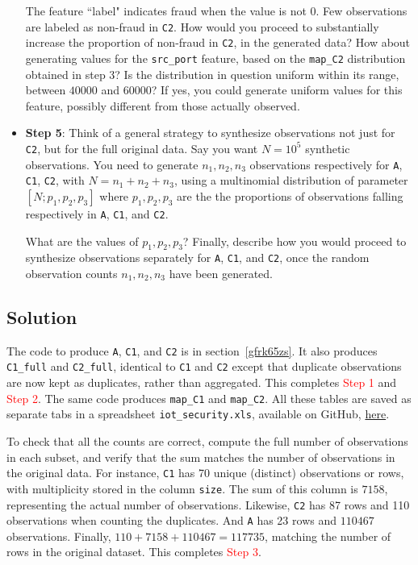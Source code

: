\documentclass[oneside,10pt]{book}
\begin{document}
\begin{itemize}
\noindent The feature ``label" indicates fraud when the value is not 0. Few observations 
 are labeled as non-fraud in \texttt{C2}. How would you proceed to substantially increase the proportion 
 of non-fraud in \texttt{C2}, in the generated data? How about generating values for the \texttt{src\_port} feature, based on the \texttt{map\_C2} distribution obtained 
 in step 3? Is the distribution in question uniform within its range, between $\num{40000}$ 
and $\num{60000}$? If yes, you could generate  uniform
 values for this feature, possibly different from those actually observed.
\vspace{1ex}

\item[] {\bf Step 5}: Think of a general strategy to synthesize observations not just for \texttt{C2}, but for the full
 original data. Say you want $N = 10^5$ synthetic observations. You need to generate $n_1, n_2, n_3$ observations respectively for 
\texttt{A}, \texttt{C1}, \texttt{C2}, with $N = n_1 + n_2 + n_3$, using a 
\textcolor{index}{multinomial distribution} of parameter $[N; p_1, p_2, p_3]$ where
  $p_1, p_2, p_3$ are the the proportions of observations falling respectively in \texttt{A}, \texttt{C1}, and \texttt{C2}.
 
What are the values of $p_1, p_2, p_3$? Finally, describe how you would proceed to synthesize observations 
 separately for \texttt{A}, \texttt{C1}, and \texttt{C2}, once the random observation counts $n_1, n_2, n_3$ have been generated.
 
\end{itemize}

\subsection{Solution}

The code to produce \texttt{A}, \texttt{C1}, and \texttt{C2} is in section~\ref{gfrk65zs}. It also 
produces \texttt{C1\_full} and \texttt{C2\_full}, identical to \texttt{C1} and \texttt{C2} except that duplicate observations are now kept as duplicates, rather
 than aggregated. 
This completes \textcolor{red}{Step 1} and \textcolor{red}{Step 2}. The same code produces
 \texttt{map\_C1} and \texttt{map\_C2}. All these tables are saved as separate tabs
 in a spreadsheet \texttt{iot\_security.xls}, available on GitHub, \href{https://github.com/VincentGranville/Main/blob/main/iot_security.xlsx}{here}.

To check that all the counts are correct, compute the full number of observations in each subset, and verify that the sum matches
  the number of observations in the original data. For instance, \texttt{C1} has 70 unique (distinct) observations or rows, with multiplicity  stored
 in the column \texttt{size}. The sum of this column is $\num{7158}$, representing the actual number of observations.
 Likewise, \texttt{C2} has 87 rows and 110 observations when counting the duplicates. And \texttt{A} has 
 23 rows and $\num{110467}$ observations. Finally, $110 + \num{7158} +\num{110467} = \num{117735}$, matching the number of rows in the original dataset.
This completes \textcolor{red}{Step 3}.
\end{document}
